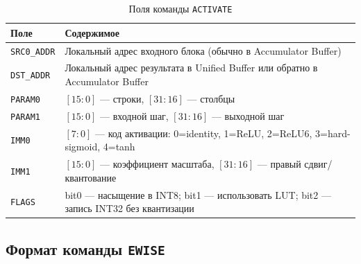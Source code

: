 \documentclass[12pt,a4paper]{article}
\begin{document}
\begin{table}[H]
    \centering
    \caption{Поля команды \texttt{ACTIVATE}}
    \begin{tabular}{|L{2.6cm}|L{10.1cm}|}
        \hline
        \textbf{Поле} & \textbf{Содержимое} \\
        \hline
        \texttt{SRC0\_ADDR} & Локальный адрес входного блока (обычно в Accumulator Buffer) \\
        \hline
        \texttt{DST\_ADDR} & Локальный адрес результата в Unified Buffer или обратно в Accumulator Buffer \\
        \hline
        \texttt{PARAM0} & \([15:0]\) --- строки, \([31:16]\) --- столбцы \\
        \hline
        \texttt{PARAM1} & \([15:0]\) --- входной шаг, \([31:16]\) --- выходной шаг \\
        \hline
        \texttt{IMM0} & \([7:0]\) --- код активации: 0=identity, 1=ReLU, 2=ReLU6, 3=hard-sigmoid, 4=tanh \\
        \hline
        \texttt{IMM1} & \([15:0]\) --- коэффициент масштаба, \([31:16]\) --- правый сдвиг/квантование \\
        \hline
        \texttt{FLAGS} & bit0 --- насыщение в INT8; bit1 --- использовать LUT; bit2 --- запись INT32 без квантизации \\
        \hline
    \end{tabular}
\end{table}

\subsection{Формат команды \texttt{EWISE}}
\end{document}
